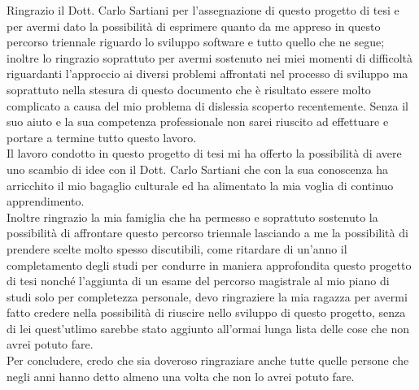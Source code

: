 \documentclass[11pt, a4paper, titlepage]{toptesi}
\makeatletter
\theoremstyle{definition}
\newcommand\listofcodes{%
 \iffrontmatter\else\frontmattertrue\fi
 \if@openright\cleardoublepage\else\clearpage\fi
 \begingroup\def\chapter##1{\@schapter}
 \phantomsection %
 \lstlistoflistings
 \endgroup
}
\makeatother
\begin{document}
\mainmatter










\ringraziamenti
Ringrazio il Dott. Carlo Sartiani per l'assegnazione di questo progetto di tesi e per avermi dato la possibilità di esprimere quanto da me appreso in questo percorso triennale riguardo lo sviluppo software e tutto quello che ne segue; inoltre lo ringrazio soprattuto per avermi sostenuto nei miei momenti di difficoltà riguardanti l'approccio ai diversi problemi affrontati nel processo di sviluppo ma soprattuto nella stesura di questo documento che è risultato essere molto complicato a causa del mio problema di dislessia scoperto recentemente.
Senza il suo aiuto e la sua competenza professionale non sarei riuscito ad effettuare e portare a termine tutto questo lavoro.\\
Il lavoro condotto in questo progetto di tesi mi ha offerto la possibilità di avere uno scambio di idee con il Dott. Carlo Sartiani che con la sua conoscenza ha arricchito il mio bagaglio culturale ed ha alimentato la mia voglia di continuo apprendimento.\\
Inoltre ringrazio la mia famiglia che ha permesso e soprattuto sostenuto la possibilità di affrontare questo percorso triennale lasciando a me la possibilità di prendere scelte molto spesso discutibili, come ritardare di un'anno il completamento degli studi per condurre in maniera approfondita questo progetto di tesi nonché l'aggiunta di un esame del percorso magistrale al mio piano di studi solo per completezza personale, devo ringraziere la mia ragazza per avermi fatto credere nella possibilità di riuscire nello sviluppo di questo progetto, senza di lei quest'utlimo sarebbe stato aggiunto all'ormai lunga lista delle cose che non avrei potuto fare.\\
Per concludere, credo che sia doveroso ringraziare anche tutte quelle persone che negli anni hanno detto almeno una volta che non lo avrei potuto fare.


\appendix




\listoffigures

\listoftables

\listofcodes


{}
\nocite{*}
\printbibliography
\end{document}
